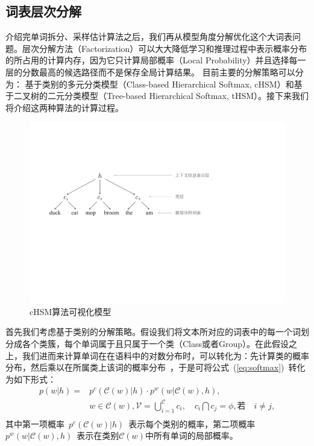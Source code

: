 \subsection{词表层次分解}
介绍完单词拆分、采样估计算法之后，我们再从模型角度分解优化这个大词表问题。层次分解方法（Factorization）可以大大降低学习和推理过程中表示概率分布的所占用的计算内存，因为它只计算局部概率（Local Probability）并且选择每一层的分数最高的候选路径而不是保存全局计算结果。
目前主要的分解策略可以分为： 基于类别的多元分类模型（Class-based Hierarchical Softmax, cHSM）和基于二叉树的二元分类模型（Tree-based Hierarchical Softmax, tHSM）。接下来我们将介绍这两种算法的计算过程。
\begin{figure}[!b]
  \centering
\includegraphics[width=.9\linewidth]{./figures/case_chsm.pdf}
\caption{cHSM算法可视化模型}\label{fig:case_hsm}
\end{figure}
首先我们考虑基于类别的分解策略。假设我们将文本所对应的词表中的每一个词划分成各个类簇，每个单词属于且只属于一个类（Class或者Group）。在此假设之上，我们进而来计算单词在在语料中的对数分布时，可以转化为：先计算类的概率分布，然后乘以在所属类上该词的概率分布~，于是可将公式~(\ref{eq:softmax})~转化为如下形式：
\begin{equation}
\begin{split}
p(w|h)=&p^c(\mathcal{C}(w)|h)\cdot p^w(w|\mathcal{C}(w),h) ,\\
 & w\in \mathcal{C}(w),\mathcal{V}=\bigcup _{i = 1}^\mathcal{C}{c_i}, \quad  c_i \bigcap c_j=\phi, \text{若}\quad i\ne j, \\
\end{split}
\end{equation}
其中第一项概率~$p^c(\mathcal{C}(w)|h)$~表示每个类别的概率，第二项概率~$p^w(w|\mathcal{C}(w),h)$~表示在类别$\mathcal{C}(w)$中所有单词的局部概率。

